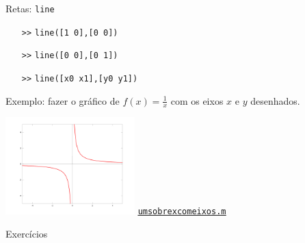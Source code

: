 \documentclass[hyperref={pdfpagelabels=false}]{beamer}
\begin{document}
\begin{frame}{Retas: {\texttt{line}}}
  \begin{itemize}
  \item[{\texttt{>>}}] {\texttt{line([1 0],[0 0])}}
  \item[{\texttt{>>}}] {\texttt{line([0 0],[0 1])}}
  \item[{\texttt{>>}}] {\texttt{line([x0 x1],[y0 y1])}}
  \end{itemize}
  
  Exemplo: fazer o gráfico de $f(x) = \frac{1}{x}$ com os eixos $x$ e $y$ desenhados.
  \begin{center}
    \includegraphics[width=5cm]{img/1overxaxes.png}
    \vfill
    \href{listings/umsobrexcomeixos.m}{\underline{\texttt{umsobrexcomeixos.m}}}
  \end{center}
\end{frame}

\begin{frame}{Exercícios}
  \begin{columns}
  \end{columns}
\end{frame}
\end{document}
